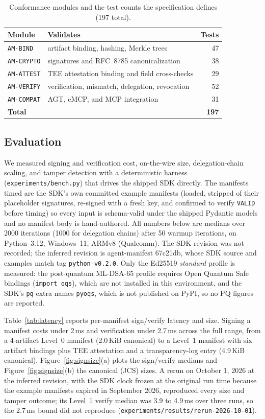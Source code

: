 \begin{table}[h]
\centering
\small
\caption{Conformance modules and the test counts the specification defines (197 total).}
\label{tab:modules}
\begin{tabular}{llr}
\toprule
Module & Validates & Tests \\
\midrule
\texttt{AM-BIND} & artifact binding, hashing, Merkle trees & 47 \\
\texttt{AM-CRYPTO} & signatures and RFC~8785 canonicalization & 38 \\
\texttt{AM-ATTEST} & TEE attestation binding and field cross-checks & 29 \\
\texttt{AM-VERIFY} & verification, mismatch, delegation, revocation & 52 \\
\texttt{AM-COMPAT} & AGT, cMCP, and MCP integration & 31 \\
\midrule
\textbf{Total} & & \textbf{197} \\
\bottomrule
\end{tabular}
\end{table}

\subsection{Evaluation}
\label{sec:eval}

We measured signing and verification cost, on-the-wire size, delegation-chain
scaling, and tamper detection with a deterministic harness
(\texttt{experiments/bench.py}) that drives the shipped SDK directly. The manifests
timed are the SDK's own committed example manifests (loaded, stripped of their
placeholder signatures, re-signed with a fresh key, and confirmed to verify
\texttt{VALID} before timing) so every input is schema-valid under the shipped
Pydantic models and no manifest body is hand-authored. All numbers below are
medians over 2000 iterations (1000 for delegation chains) after 50 warmup
iterations, on Python~3.12, Windows~11, ARMv8 (Qualcomm). The SDK revision was not
recorded; the inferred revision is agent-manifest 67c21db, whose SDK source and
examples match tag \texttt{python-v0.2.0}. Only the Ed25519
\emph{standard} profile is measured: the post-quantum ML-DSA-65 profile requires
Open Quantum Safe bindings (\texttt{import oqs}), which are not installed in this
environment, and the SDK's \texttt{pq} extra names \texttt{pyoqs}, which is not
published on PyPI, so no PQ figures are reported.

Table~\ref{tab:latency} reports per-manifest sign/verify latency and size.
Signing a manifest costs under 2\,ms and verification under 2.7\,ms across the full
range, from a 4-artifact Level~0 manifest (2.0\,KiB canonical) to a Level~1 manifest
with six artifact bindings plus TEE attestation and a transparency-log entry
(4.9\,KiB canonical). Figure~\ref{fig:signsize}(a) plots the sign/verify medians and
Figure~\ref{fig:signsize}(b) the canonical (JCS) sizes. A rerun on October 1, 2026 at
the inferred revision, with the SDK clock frozen at the original run time because the
example manifests expired in September 2026, reproduced every size and tamper
outcome; its Level~1 verify median was 3.9 to 4.9\,ms over three runs, so the 2.7\,ms
bound did not reproduce (\texttt{experiments/results/rerun-2026-10-01}).


